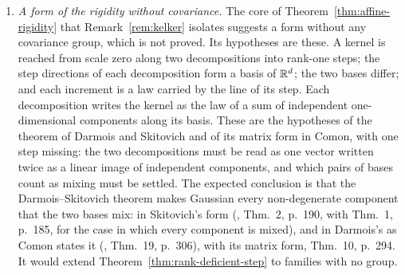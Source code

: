 \begin{enumerate}
\item \emph{A form of the rigidity without covariance.}\label{prob:no-covariance} The core of
Theorem~\ref{thm:affine-rigidity} that Remark~\ref{rem:kelker} isolates suggests a form without any
covariance group, which is not proved. Its hypotheses are these. A
kernel is reached from scale zero along two decompositions into rank-one steps; the step
directions of each decomposition form a basis of $\mathbb{R}^d$; the two bases differ; and each increment
is a law carried by the line of its step. Each decomposition writes the kernel as the law of a sum
of independent one-dimensional components along its basis. These are the hypotheses of the
theorem of Darmois and Skitovich and of its matrix form in Comon, with one step missing: the two decompositions
must be read as one vector written twice as a linear image of independent components, and which pairs
of bases count as mixing must be settled. The expected conclusion is that the Darmois--Skitovich
theorem makes Gaussian every non-degenerate component that the two bases mix: in Skitovich's form
(, Thm.~2, p.~190, with Thm.~1, p.~185, for the case in which every
component is mixed), and in Darmois's as Comon states it (, Thm.~19,
p.~306), with its matrix form, Thm.~10, p.~294. It would
extend Theorem~\ref{thm:rank-deficient-step} to families with no group.
\end{enumerate}

